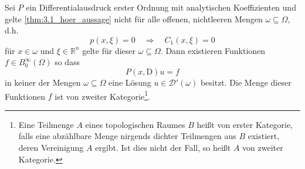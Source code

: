\begin{thm}\label{thm:2_hoer}
Sei $P$ ein Differentialausdruck erster Ordnung mit analytischen Koeffizienten und gelte \ref{thm:3.1_hoer_aussage} nicht für alle offenen, nichtleeren Mengen $\omega\subseteq\Omega$, d.h. 
\begin{equation}
p(x,\xi)=0 \quad\Rightarrow\quad C_1(x,\xi)=0
\end{equation}
für $x\in\omega$ und $\xi\in\mathbb{R}^n$ gelte für  dieser $\omega\subseteq\Omega$.
Dann existieren Funktionen $f\in B_0^\infty(\Omega)$ so dass
\begin{equation}\label{lewy:pxDu=f}
P(x,\mathrm D)u=f
\end{equation}
in keiner der Mengen $\omega\subseteq\Omega$ eine Lösung $u\in\mathcal{D}'(\omega)$ besitzt. Die Menge dieser Funktionen $f$ ist von zweiter Kategorie\footnote{Eine Teilmenge $A$ eines topologischen Raumes $B$ heißt von erster Kategorie, falls eine abzählbare Menge nirgends dichter Teilmengen aus $B$ existiert, deren Vereinigung $A$ ergibt. Ist dies nicht der Fall, so heißt $A$ von zweiter Kategorie.}.
\end{thm}

